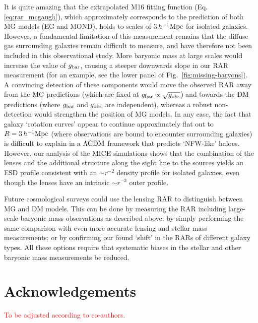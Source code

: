 \documentclass[usenatbib]{mnras}
\newcommand{\hMpc}{\, h^{-1}{\rm{Mpc}} }
\newcommand{\lcdm}{{\rm \Lambda CDM}}
\newcommand{\un}[1]{_{\rm #1}}
\begin{document}
It is quite amazing that the extrapolated M16 fitting function (Eq. \ref{eq:rar_mcgaugh}), which approximately corresponds to the prediction of both MG models (EG and MOND), holds to scales of $3 \hMpc$ for isolated galaxies. However, a fundamental limitation of this measurement remains that the diffuse gas surrounding galaxies remain difficult to measure, and have therefore not been included in this observational study. More baryonic mass at large scales would increase the value of $g\un{bar}$, causing a steeper downwards slope in our RAR measurement (for an example, see the lower panel of Fig.~\ref{fig:missing-baryons}). A convincing detection of these components would move the observed RAR away from the MG predictions (which are fixed at $g\un{bar} \propto \sqrt{g\un{obs}}$) and towards the DM predictions (where $g\un{bar}$ and $g\un{obs}$ are independent), whereas a robust non-detection would strengthen the position of MG models. In any case, the fact that galaxy `rotation curves' appear to continue approximately flat out to $R=3\hMpc$ (where observations are bound to encounter surrounding galaxies) is difficult to explain in a $\lcdm$ framework that predicts `NFW-like' haloes. However, our analysis of the MICE simulations shows that the combination of the lenses and the additional structure along the sight line to the sources yields an ESD profile consistent with an $\sim r^{-2}$ density profile for isolated galaxies, even though the lenses have an intrinsic $\sim r^{-3}$ outer profile.

Future cosmological surveys could use the lensing RAR to distinguish between MG and DM models. This can be done by measuring the RAR including large-scale baryonic mass observations as described above; by simply performing the same comparison with even more accurate lensing and stellar mass measurements; or by confirming our found `shift' in the RARs of different galaxy types. All these options require that systematic biases in the stellar and other baryonic mass measurements be reduced.




\section*{Acknowledgements}
\textcolor{red}{To be adjusted according to co-authors.}
\end{document}
